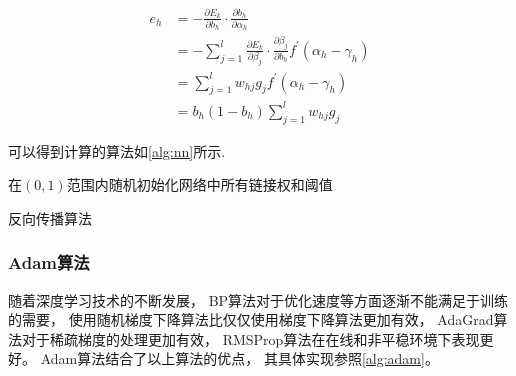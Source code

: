 \begin{equation}
    \label{eq:e}
    \begin{aligned}
        e _ { h } & = - \frac { \partial E _ { k } } { \partial b _ { h } } \cdot \frac { \partial b _ { h } } { \partial \alpha _ { h } }                                                                                \\
                  & = - \sum _ { j = 1 } ^ { l } \frac { \partial E _ { k } } { \partial \beta _ { j } } \cdot \frac { \partial \beta _ { j } } { \partial b _ { h } } f ^ { \prime } ( \alpha _ { h } - \gamma _ { h } ) \\
                  & = \sum _ { j = 1 } ^ { l } w _ { h j } g _ { j } f ^ { \prime } ( \alpha _ { h } - \gamma _ { h } )                                                                                                   \\
                  & = b _ { h } ( 1 - b _ { h } ) \sum _ { j = 1 } ^ { l } w _ { h j } g _ { j }
    \end{aligned}
\end{equation}

可以得到计算的算法如\cref{alg:nn}所示\cite{zhouzhihuaJiQiXueXi}.

\begin{algorithm}
    在$(0, 1)$范围内随机初始化网络中所有链接权和阈值\;
    \caption{反向传播算法}
    \label{alg:nn}
\end{algorithm}

\subsubsection{Adam算法}

随着深度学习技术的不断发展，
BP算法对于优化速度等方面逐渐不能满足于训练的需要，
使用随机梯度下降算法比仅仅使用梯度下降算法更加有效，
AdaGrad算法对于稀疏梯度的处理更加有效\cite{duchiAdaptiveSubgradientMethods2011}，
RMSProp算法在在线和非平稳环境下表现更好\cite{tielemanLecture5rmspropDivide2012}。
Adam算法结合了以上算法的优点，
其具体实现参照\cref{alg:adam}\cite{kingmaAdamMethodStochastic2017}。

